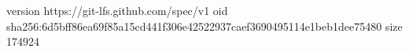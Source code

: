 version https://git-lfs.github.com/spec/v1
oid sha256:6d5bff86ea69f85a15cd441f306e42522937caef3690495114e1beb1dee75480
size 174924
